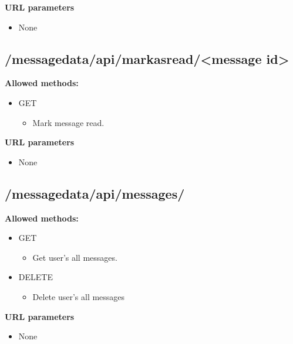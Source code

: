 \documentclass[letterpaper,10pt,english]{sphinxmanual}
\begin{document}
\textbf{URL parameters}
\begin{itemize}
\item {} 
None

\end{itemize}


\subsection{/messagedata/api/markasread/\textless{}message id\textgreater{}}
\label{restdoc:messagedata-api-markasread-message-id}
\textbf{Allowed methods:}
\begin{itemize}
\item {} 
GET
\begin{itemize}
\item {} 
Mark message read.

\end{itemize}

\end{itemize}

\textbf{URL parameters}
\begin{itemize}
\item {} 
None

\end{itemize}


\subsection{/messagedata/api/messages/}
\label{restdoc:messagedata-api-messages}
\textbf{Allowed methods:}
\begin{itemize}
\item {} 
GET
\begin{itemize}
\item {} 
Get user's all messages.

\end{itemize}

\item {} 
DELETE
\begin{itemize}
\item {} 
Delete user's all messages

\end{itemize}

\end{itemize}

\textbf{URL parameters}
\begin{itemize}
\item {} 
None

\end{itemize}
\end{document}
